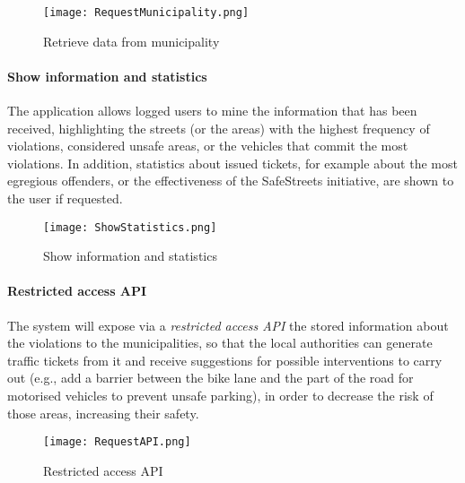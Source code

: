 	\begin{figure}[h]
		\centering
		\texttt{[image: RequestMunicipality.png]}
		\caption{
			\label{fig:retrieveMunicipality} Retrieve data from municipality
		}
	\end{figure}
	
\clearpage

\paragraph{Show information and statistics}
The application allows logged users to mine the information that has been received, highlighting the streets (or the areas) with the highest frequency of violations, considered unsafe areas, or the vehicles that commit the most violations. In addition, statistics about issued tickets, for example about the most egregious offenders, or the effectiveness of the SafeStreets initiative, are shown to the user if requested. \newline
	\begin{figure}[h]
		\centering
		\texttt{[image: ShowStatistics.png]}
		\caption{
			\label{fig:showStatistics} Show information and statistics
		}
	\end{figure}
	
\paragraph{Restricted access API}
The system will expose via a \emph{restricted access API} the stored information about the violations to the municipalities, so that the local authorities can generate traffic tickets from it and receive suggestions for possible interventions to carry out (e.g., add a barrier between the bike lane and the part of the road for motorised vehicles to prevent unsafe parking), in order to decrease the risk of those areas, increasing their safety. \newline
	\begin{figure}[h]
		\centering
		\texttt{[image: RequestAPI.png]}
		\caption{
			\label{fig:restrictedAPI} Restricted access API
		}
	\end{figure}


